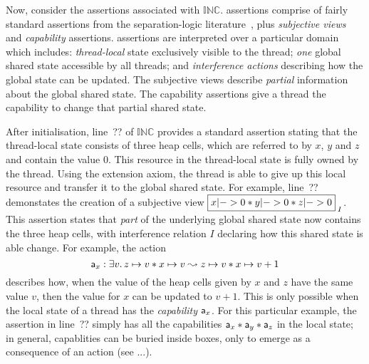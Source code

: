 


Now, consider the \colosl assertions associated with $\mathbb{INC}$.
\colosl assertions comprise of fairly standard assertions from the
separation-logic literature~\cite{rey02,sepish,variablesasresource},
plus {\em subjective views} and {\em capability} assertions. \colosl
assertions are interpreted over a particular domain which includes:
{\em thread-local} state exclusively visible to the thread; {\em one}
global shared state accessible by all threads; and {\em  interference
actions}  describing how the global state can be updated. The
subjective views describe {\em partial} information about the global
shared state. The capability assertions give a thread the capability
to change that partial shared state.




After
initialisation, line~?? of $\mathbb{INC}$  provides a standard assertion stating that 
the thread-local state consists of three  heap cells,  which are referred to by  $x$,
$y$ and $z$ and contain the value  $0$. This resource in the thread-local state is
fully owned by  the thread. Using the extension axiom, the thread is able to give up  this local
resource and transfer it  to the global shared state. For example, line~?? demonstates the
creation of a subjective view $\shared{x|-> 0 * y|-> 0 * z|->
  0}I$. This assertion states that {\em part} of the underlying
global shared state now contains the three heap cells, with 
interference relation $I$ declaring  how  this shared state  is able 
change. For example,  the action 
\[
\mathsf{a}_x:  \exists v.\,  z \mapsto v * x \mapsto v \mathrel{\leadsto}
    z \mapsto v * x \mapsto v+1
\]
describes how, when the value of the heap cells given  by   $x$
and $z$ have the same value $v$, then the value for $x$ can be updated
to $v+1$. This is only possible when the
local state of a thread has the {\em capability} $\mathsf{a}_x$. For  this
particular 
example, the assertion in line~?? simply has all the capabilities $\mathsf{a}_x * \mathsf{a}_y * \mathsf{a}_z$   in the local state; in general,
capablities can be buried inside boxes, only to emerge as a
consequence of an action
(see  ...). 

